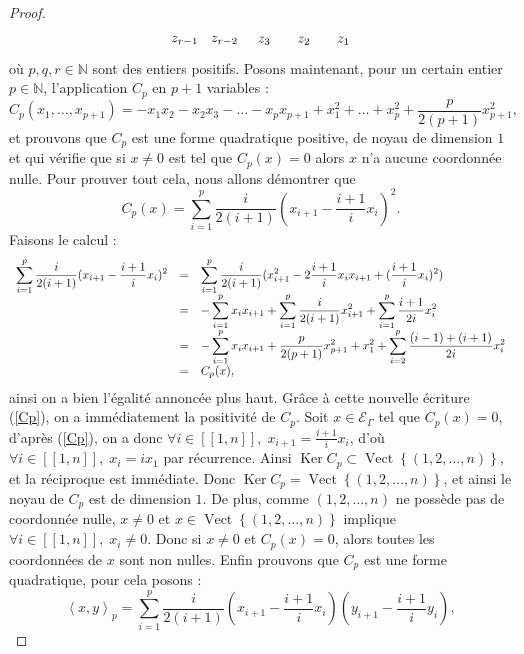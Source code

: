 \documentclass[a4paper,11pt]{article}
\DeclareMathOperator{\Ker}{Ker}
\DeclareMathOperator{\Vect}{Vect}
\newcommand{\ps}[2]{\left\langle#1,#2\right\rangle}
\newcommand{\EG}{\mathscr{E}_\Gamma}
\newcommand{\ent}[2]{[\![#1,#2]\!]}
\newcommand{\dps}{\displaystyle}
\begin{document}
\begin{proof}
\begin{equation}
\begin{tikzpicture}
			\node () at (6,1.3cm) {$z_{r-1}$};
			\node () at (7,1.3cm) {$z_{r-2}$};
			\node () at (8,1.3cm) {$z_{3}$};
			\node () at (9,1.3cm) {$z_{2}$};
			\node () at (10,1.3cm) {$z_{1}$};
	\end{tikzpicture}
	\end{equation}
	où $p,q,r\in\mathbb N$ sont des entiers positifs. Posons maintenant, pour un certain entier $p\in\mathbb N$, l'application $C_p$ en $p+1$ variables :
		\[
			C_p(x_1,\dots,x_{p+1})=-x_1x_2-x_2x_3-\dots-x_px_{p+1}+x_1^2+\dots+x_p^2+\frac{p}{2(p+1)}x_{p+1}^2,
	\]
	et prouvons que $C_p$ est une forme quadratique positive, de noyau de dimension $1$ et qui vérifie que si $x\neq0$ est tel que $C_p(x)=0$ alors $x$ n'a aucune coordonnée nulle. Pour prouver tout cela, nous allons démontrer que 
	\begin{equation}
		C_p(x)=\sum_{i=1}^p\frac{i}{2(i+1)}(x_{i+1}-\frac{i+1}{i}x_i)^2.
		\label{Cp}
	\end{equation}
	Faisons le calcul :
	\[
		\begin{array}{>{\dps}r>{\dps}l>{\dps}l}
	\sum_{i=1}^p\frac{i}{2(i+1)}(x_{i+1}-\frac{i+1}{i}x_i)^2&=& \sum_{i=1}^p\frac{i}{2(i+1)}(x_{i+1}^2-2\frac{i+1}{i}x_ix_{i+1}+(\frac{i+1}{i}x_i)^2)\\
	&=& -\sum_{i=1}^px_ix_{i+1}+\sum_{i=1}^p\frac{i}{2(i+1)}x_{i+1}^2+\sum_{i=1}^p\frac{i+1}{2i}x_i^2\\
	&=& -\sum_{i=1}^px_ix_{i+1}+\frac{p}{2(p+1)}x_{p+1}^2+x_1^2+\sum_{i=2}^p\frac{(i-1)+(i+1)}{2i}x_i^2\\
	&=& C_p(x),\\
\end{array}
	\]
	ainsi on a bien l'égalité annoncée plus haut. Gr\^ace à cette nouvelle écriture (\ref{Cp}), on a immédiatement la positivité de $C_p$. Soit $x\in\EG$ tel que $C_p(x)=0$, d'après (\ref{Cp}), on a donc $\forall i \in\ent{1}{n},\;x_{i+1}=\frac{i+1}{i}x_i$, d'où $\forall i\in\ent{1}{n},\;x_i=ix_1$ par récurrence. Ainsi $\Ker C_p\subset\Vect\left\{ (1,2,\dots,n) \right\}$, et la réciproque est immédiate. Donc $\Ker C_p=\Vect\left\{ (1,2,\dots,n) \right\}$, et ainsi le noyau de $C_p$ est de dimension $1$. De plus, comme $(1,2,\dots,n)$ ne possède pas de coordonnée nulle, $x\neq0$ et $x\in\Vect\left\{ (1,2,\dots,n) \right\}$ implique $\forall i\in\ent{1}{n},\;x_i\neq0$. Donc si $x\neq0$ et $C_p(x)=0$, alors toutes les coordonnées de $x$ sont non nulles. Enfin prouvons que $C_p$ est une forme quadratique, pour cela posons :
	\[
		\ps{x}{y}_p=\sum_{i=1}^p\frac{i}{2(i+1)}(x_{i+1}-\frac{i+1}{i}x_i)(y_{i+1}-\frac{i+1}{i}y_i),
\]
\end{proof}
\end{document}
